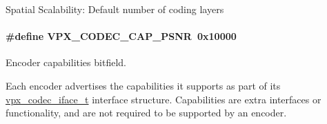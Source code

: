 \-Spatial \-Scalability\-: \-Default number of coding layers \hypertarget{group__encoder_ga398803f408d6f71aae730b5ee7793e1c}{
\paragraph[{\-V\-P\-X\-\_\-\-C\-O\-D\-E\-C\-\_\-\-C\-A\-P\-\_\-\-P\-S\-N\-R}]{\setlength{\rightskip}{0pt plus 5cm}\#define {\bf \-V\-P\-X\-\_\-\-C\-O\-D\-E\-C\-\_\-\-C\-A\-P\-\_\-\-P\-S\-N\-R}~0x10000}}\label{group__encoder_ga398803f408d6f71aae730b5ee7793e1c}


\-Encoder capabilities bitfield. 

\-Each encoder advertises the capabilities it supports as part of its \hyperlink{group__codec_gad654f3da60151f5dfef70aca00ef1e9e}{vpx\-\_\-codec\-\_\-iface\-\_\-t} interface structure. \-Capabilities are extra interfaces or functionality, and are not required to be supported by an encoder.

